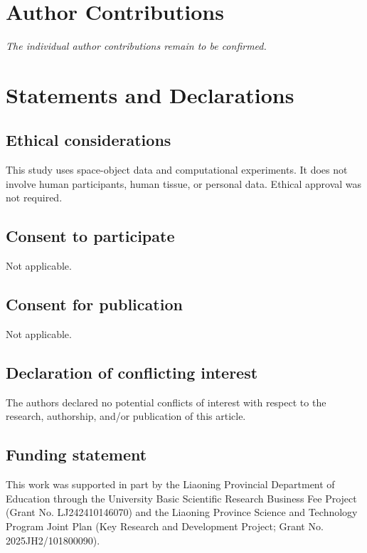 \documentclass[Royal,sageh,times]{sagej}
\begin{document}
\section*{Author Contributions}
\textit{The individual author contributions remain to be confirmed.}
\section*{Statements and Declarations}
\subsection*{Ethical considerations}
This study uses space-object data and computational experiments. It does not involve human participants, human tissue, or personal data. Ethical approval was not required.
\subsection*{Consent to participate}
Not applicable.
\subsection*{Consent for publication}
Not applicable.
\subsection*{Declaration of conflicting interest}
The authors declared no potential conflicts of interest with respect to the research, authorship, and/or publication of this article.
\subsection*{Funding statement}
This work was supported in part by the Liaoning Provincial Department of Education through the University Basic Scientific Research Business Fee Project (Grant No. LJ242410146070) and the Liaoning Province Science and Technology Program Joint Plan (Key Research and Development Project; Grant No. 2025JH2/101800090).
\end{document}

